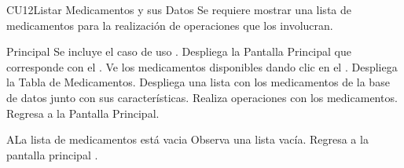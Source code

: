 \begin{UseCase}{CU12}{Listar Medicamentos y sus Datos}{
		Se requiere mostrar una lista de medicamentos para la realización de operaciones que los involucran.
	}
	\end{UseCase}
	\begin{UCtrayectoria}{Principal}
		\UCpaso Se incluye el caso de uso .
		\UCpaso Despliega la  {Pantalla Principal} que corresponde con el \UCactor.
		\UCpaso[\UCactor] Ve los medicamentos disponibles dando clic en el .
		\UCpaso Despliega la  {Tabla de Medicamentos}.
		\UCpaso Despliega una lista con los medicamentos de la base de datos junto con sus características.
		\UCpaso[\UCactor] Realiza operaciones con los medicamentos.
		\UCpaso [\UCactor] Regresa a la  {Pantalla Principal}.
	
	\end{UCtrayectoria}


		\begin{UCtrayectoriaA}{A}{La lista de medicamentos está vacia}
			\UCpaso[\UCactor] Observa una lista vacía.
			\UCpaso[\UCactor] Regresa a la pantalla principal .
		\end{UCtrayectoriaA}

